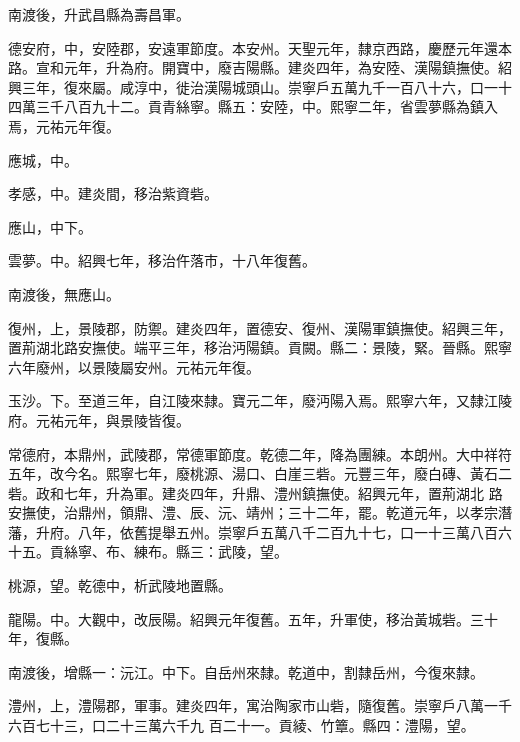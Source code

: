 \begin{pinyinscope}
 南渡後，升武昌縣為壽昌軍。



 德安府，中，安陸郡，安遠軍節度。本安州。天聖元年，隸京西路，慶歷元年還本路。宣和元年，升為府。開寶中，廢吉陽縣。建炎四年，為安陸、漢陽鎮撫使。紹興三年，復來屬。咸淳中，徙治漢陽城頭山。崇寧戶五萬九千一百八十六，口一十四萬三千八百九十二。貢青絲寧。縣五：安陸，中。熙寧二年，省雲夢縣為鎮入焉，元祐元年復。



 應城，中。



 孝感，中。建炎間，移治紫資砦。



 應山，中下。



 雲夢。中。紹興七年，移治仵落市，十八年復舊。



 南渡後，無應山。



 復州，上，景陵郡，防禦。建炎四年，置德安、復州、漢陽軍鎮撫使。紹興三年，置荊湖北路安撫使。端平三年，移治沔陽鎮。貢闕。縣二：景陵，緊。晉縣。熙寧六年廢州，以景陵屬安州。元祐元年復。



 玉沙。下。至道三年，自江陵來隸。寶元二年，廢沔陽入焉。熙寧六年，又隸江陵府。元祐元年，與景陵皆復。



 常德府，本鼎州，武陵郡，常德軍節度。乾德二年，降為團練。本朗州。大中祥符五年，改今名。熙寧七年，廢桃源、湯口、白崖三砦。元豐三年，廢白磚、黃石二砦。政和七年，升為軍。建炎四年，升鼎、澧州鎮撫使。紹興元年，置荊湖北
 路安撫使，治鼎州，領鼎、澧、辰、沅、靖州；三十二年，罷。乾道元年，以孝宗潛藩，升府。八年，依舊提舉五州。崇寧戶五萬八千二百九十七，口一十三萬八百六十五。貢絲寧、布、練布。縣三：武陵，望。



 桃源，望。乾德中，析武陵地置縣。



 龍陽。中。大觀中，改辰陽。紹興元年復舊。五年，升軍使，移治黃城砦。三十年，復縣。



 南渡後，增縣一：沅江。中下。自岳州來隸。乾道中，割隸岳州，今復來隸。



 澧州，上，澧陽郡，軍事。建炎四年，寓治陶家市山砦，隨復舊。崇寧戶八萬一千六百七十三，口二十三萬六千九
 百二十一。貢綾、竹簟。縣四：澧陽，望。




\end{pinyinscope}
